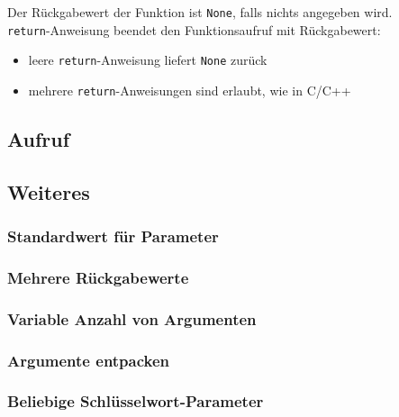Der Rückgabewert der Funktion ist \texttt{None}, falls nichts angegeben wird.\\


\texttt{return}-Anweisung beendet den Funktionsaufruf mit Rückgabewert:\\

\begin{itemize}
	\item leere \texttt{return}-Anweisung liefert \texttt{None} zurück
	\item mehrere \texttt{return}-Anweisungen sind erlaubt, wie in C/C++
\end{itemize}

\subsection{Aufruf}


\subsection{Weiteres}

\subsubsection{Standardwert für Parameter}


\subsubsection{Mehrere Rückgabewerte}


\subsubsection{Variable Anzahl von Argumenten}


\subsubsection{Argumente entpacken}


\subsubsection{Beliebige Schlüsselwort-Parameter}



